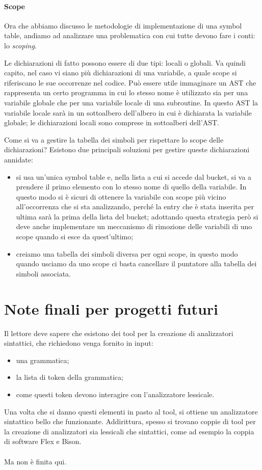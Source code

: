 \documentclass[class=book, crop=false, oneside, 12pt]{standalone}
\begin{document}
\paragraph{Scope} Ora che abbiamo discusso le metodologie di implementazione di una symbol table, andiamo ad analizzare una problematica con cui tutte devono fare i conti: lo \emph{scoping}.

Le dichiarazioni di fatto possono essere di due tipi: locali o globali.
Va quindi capito, nel caso vi siano più dichiarazioni di una variabile, a quale scope si riferiscano le sue occorrenze nel codice.
Può essere utile immaginare un AST che rappresenta un certo programma in cui lo stesso nome è utilizzato sia per una variabile globale che per una variabile locale di una subroutine.
In questo AST la variabile locale sarà in un sottoalbero dell'albero in cui è dichiarata la variabile globale; le dichiarazioni locali sono comprese in sottoalberi dell'AST.

Come si va a gestire la tabella dei simboli per rispettare lo scope delle dichiarazioni?
\noindent
Esistono due principali soluzioni per gestire queste dichiarazioni annidate:
\begin{itemize}
    \item si usa un'unica symbol table e, nella lista a cui si accede dal bucket, si va a prendere il primo elemento con lo stesso nome di quello della variabile. In questo modo si è sicuri di ottenere la variabile con scope più vicino all'occorrenza che si sta analizzando, perché la entry che è stata inserita per ultima sarà la prima della lista del bucket; adottando questa strategia però si deve anche implementare un meccanismo di rimozione delle variabili di uno scope quando si esce da quest'ultimo;
    \item creiamo una tabella dei simboli diversa per ogni scope, in questo modo quando usciamo da uno scope ci basta cancellare il puntatore alla tabella dei simboli associata.
\end{itemize}

\section{Note finali per progetti futuri}
Il lettore deve sapere che esistono dei tool per la creazione di analizzatori sintattici, che richiedono venga fornito in input:
\begin{itemize}
    \item una grammatica;
    \item la lista di token della grammatica; 
    \item come questi token devono interagire con l'analizzatore lessicale.
\end{itemize}
Una volta che si danno questi elementi in pasto al tool, si ottiene un analizzatore sintattico bello che funzionante. Addirittura, spesso si trovano coppie di tool per la creazione di analizzatori sia lessicali che sintattici, come ad esempio la coppia di software Flex e Bison.
\\\\
Ma non è finita qui.
\end{document}
